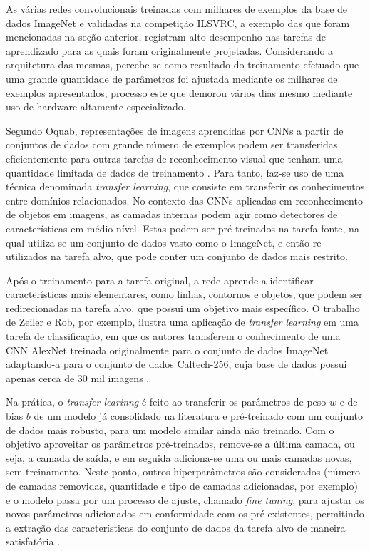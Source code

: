 As várias redes convolucionais treinadas com milhares de exemplos da base de dados  ImageNet e validadas na competição ILSVRC, a exemplo das que foram mencionadas na seção anterior, registram alto desempenho nas tarefas de aprendizado para as quais foram originalmente projetadas. Considerando a arquitetura das mesmas, percebe-se como resultado do treinamento efetuado que uma grande quantidade de parâmetros foi ajustada mediante os milhares de exemplos apresentados, processo este que demorou vários dias mesmo mediante uso de hardware altamente especializado.

Segundo Oquab, representações de imagens aprendidas por CNNs a partir de conjuntos de dados com grande número de exemplos podem ser transferidas eficientemente para outras tarefas de reconhecimento visual que tenham uma quantidade limitada de dados de treinamento \cite{oquab2014learning}. Para tanto, faz-se uso de uma técnica denominada \emph{transfer learning}, que consiste em transferir os conhecimentos entre domínios relacionados. No contexto das CNNs aplicadas em reconhecimento de objetos em imagens, as camadas internas podem agir como detectores de características em médio nível. Estas podem ser pré-treinados na tarefa fonte, na qual utiliza-se um conjunto de dados vasto como o ImageNet, e então re-utilizados na tarefa alvo, que pode conter um conjunto de dados mais restrito.

Após o treinamento para a tarefa original, a rede aprende a identificar características mais elementares, como linhas, contornos e objetos, que podem ser redirecionadas na tarefa alvo, que possui um objetivo mais específico. O trabalho de Zeiler e Rob, por exemplo, ilustra uma aplicação de \emph{transfer learning} em uma tarefa de classificação, em que os autores transferem o conhecimento de uma CNN AlexNet treinada originalmente para o conjunto de dados ImageNet adaptando-a para o conjunto de dados Caltech-256, cuja base de dados possui apenas cerca de 30 mil imagens \cite{zeiler2014visualizing}.

Na prática, o \emph{transfer learinng} é feito ao transferir os parâmetros de peso $w$ e de bias $b$ de um modelo já consolidado na literatura e pré-treinado com um conjunto de dados mais robusto, para um modelo similar ainda não treinado. Com o objetivo aproveitar os parâmetros pré-treinados, remove-se a última camada, ou seja, a camada de saída, e em seguida adiciona-se uma ou mais camadas novas, sem treinamento. Neste ponto, outros hiperparâmetros são considerados (número de camadas removidas, quantidade e tipo de camadas adicionadas, por exemplo) e o modelo passa por um processo de ajuste, chamado \emph{fine tuning}, para ajustar os novos parâmetros adicionados em conformidade com os pré-existentes, permitindo a extração das características do conjunto de dados da tarefa alvo de maneira satisfatória \cite{oquab2014learning}.
